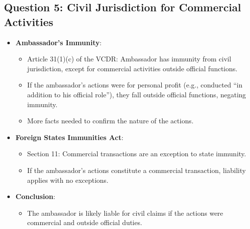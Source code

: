 \subsection{Question 5: Civil Jurisdiction for Commercial Activities}
\begin{itemize}
    \item \textbf{Ambassador’s Immunity}:
    \begin{itemize}
        \item Article 31(1)(c) of the VCDR: Ambassador has immunity from civil jurisdiction, except for commercial activities outside official functions.
        \item If the ambassador’s actions were for personal profit (e.g., conducted ``in addition to his official role''), they fall outside official functions, negating immunity.
        \item More facts needed to confirm the nature of the actions.
    \end{itemize}
    \item \textbf{Foreign States Immunities Act}:
    \begin{itemize}
        \item Section 11: Commercial transactions are an exception to state immunity.
        \item If the ambassador’s actions constitute a commercial transaction, liability applies with no exceptions.
    \end{itemize}
    \item \textbf{Conclusion}:
    \begin{itemize}
        \item The ambassador is likely liable for civil claims if the actions were commercial and outside official duties.
    \end{itemize}
\end{itemize}

